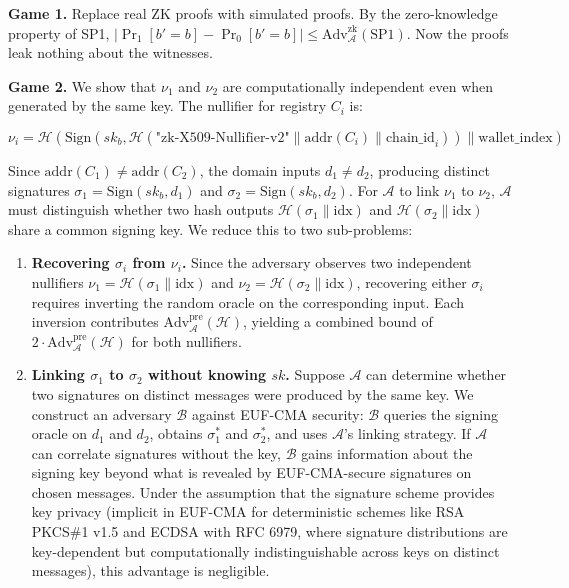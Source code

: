 \documentclass[11pt, a4paper]{article}
\begin{document}
\textbf{Game 1.} Replace real ZK proofs with simulated proofs. By the
zero-knowledge property of SP1,
\(|\Pr_1[b' = b] - \Pr_0[b' = b]| \leq \text{Adv}_{\mathcal{A}}^{\text{zk}}(\text{SP1})\).
Now the proofs leak nothing about the witnesses.

\textbf{Game 2.} We show that \(\nu_1\) and \(\nu_2\) are
computationally independent even when generated by the same key. The
nullifier for registry \(C_i\) is:

\[\nu_i = \mathcal{H}(\text{Sign}(sk_b, \mathcal{H}(\text{"zk-X509-Nullifier-v2"} \| \text{addr}(C_i) \| \text{chain\_id}_i)) \| \text{wallet\_index})\]

Since \(\text{addr}(C_1) \neq \text{addr}(C_2)\), the domain inputs
\(d_1 \neq d_2\), producing distinct signatures
\(\sigma_1 = \text{Sign}(sk_b, d_1)\) and
\(\sigma_2 = \text{Sign}(sk_b, d_2)\). For \(\mathcal{A}\) to link
\(\nu_1\) to \(\nu_2\), \(\mathcal{A}\) must distinguish whether two
hash outputs \(\mathcal{H}(\sigma_1 \| \text{idx})\) and
\(\mathcal{H}(\sigma_2 \| \text{idx})\) share a common signing key. We
reduce this to two sub-problems:

\begin{enumerate}
\def\labelenumi{(\alph{enumi})}
\item
  \textbf{Recovering \(\sigma_i\) from \(\nu_i\).} Since the adversary
  observes two independent nullifiers
  \(\nu_1 = \mathcal{H}(\sigma_1 \| \text{idx})\) and
  \(\nu_2 = \mathcal{H}(\sigma_2 \| \text{idx})\), recovering either
  \(\sigma_i\) requires inverting the random oracle on the corresponding
  input. Each inversion contributes
  \(\text{Adv}_{\mathcal{A}}^{\text{pre}}(\mathcal{H})\), yielding a
  combined bound of
  \(2 \cdot \text{Adv}_{\mathcal{A}}^{\text{pre}}(\mathcal{H})\) for
  both nullifiers.
\item
  \textbf{Linking \(\sigma_1\) to \(\sigma_2\) without knowing \(sk\).}
  Suppose \(\mathcal{A}\) can determine whether two signatures on
  distinct messages were produced by the same key. We construct an
  adversary \(\mathcal{B}\) against EUF-CMA security: \(\mathcal{B}\)
  queries the signing oracle on \(d_1\) and \(d_2\), obtains
  \(\sigma_1^*\) and \(\sigma_2^*\), and uses \(\mathcal{A}\)'s linking
  strategy. If \(\mathcal{A}\) can correlate signatures without the key,
  \(\mathcal{B}\) gains information about the signing key beyond what is
  revealed by EUF-CMA-secure signatures on chosen messages. Under the
  assumption that the signature scheme provides key privacy (implicit in
  EUF-CMA for deterministic schemes like RSA PKCS\#1 v1.5 and ECDSA with
  RFC 6979, where signature distributions are key-dependent but
  computationally indistinguishable across keys on distinct messages),
  this advantage is negligible.
\end{enumerate}
\end{document}
